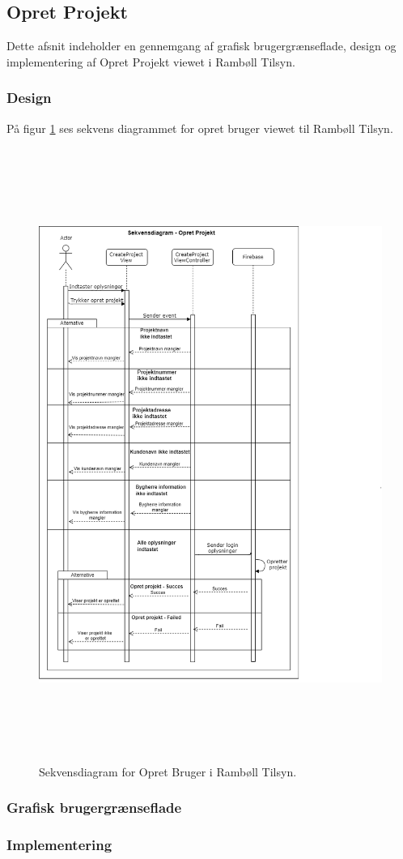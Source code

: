 \subsection{Opret Projekt}
Dette afsnit indeholder en gennemgang af grafisk brugergrænseflade, design og implementering af Opret Projekt viewet i Rambøll Tilsyn.

\subsubsection{Design}
På figur \ref{fig:OpretProjektSekvens} ses sekvens diagrammet for opret bruger viewet til Rambøll Tilsyn.
\begin{figure}[H] %
	\centering
	\includegraphics[height=20cm, width=15cm]{../ArkitekturDesign/Design/OpretProjekt/OpretProjektSekvensDiagram}
	\caption{Sekvensdiagram for Opret Bruger i Rambøll Tilsyn.}
	\label{fig:OpretProjektSekvens}
\end{figure}

\subsubsection{Grafisk brugergrænseflade}

\subsubsection{Implementering}

\clearpage